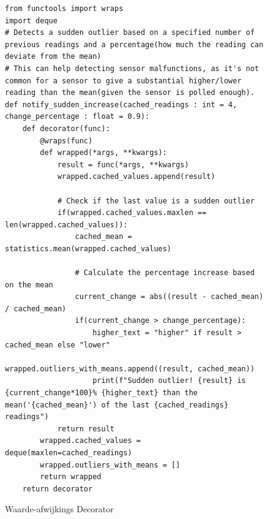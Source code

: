 \documentclass[a4paper]{report}
\begin{document}
\begin{figure}[H]
\begin{verbatim}
from functools import wraps
import deque
# Detects a sudden outlier based on a specified number of previous readings and a percentage(how much the reading can deviate from the mean)
# This can help detecting sensor malfunctions, as it's not common for a sensor to give a substantial higher/lower reading than the mean(given the sensor is polled enough).
def notify_sudden_increase(cached_readings : int = 4, change_percentage : float = 0.9):
    def decorator(func):
        @wraps(func)
        def wrapped(*args, **kwargs):
            result = func(*args, **kwargs)
            wrapped.cached_values.append(result)

            # Check if the last value is a sudden outlier
            if(wrapped.cached_values.maxlen == len(wrapped.cached_values)):
                cached_mean = statistics.mean(wrapped.cached_values)

                # Calculate the percentage increase based on the mean
                current_change = abs((result - cached_mean) / cached_mean)
                if(current_change > change_percentage):
                    higher_text = "higher" if result > cached_mean else "lower"
                    wrapped.outliers_with_means.append((result, cached_mean))
                    print(f"Sudden outlier! {result} is {current_change*100}% {higher_text} than the mean('{cached_mean}') of the last {cached_readings} readings")
            return result
        wrapped.cached_values = deque(maxlen=cached_readings)
        wrapped.outliers_with_means = []
        return wrapped 
    return decorator
\end{verbatim}
\caption{Waarde-afwijkings Decorator}
\label{fig:decorator_sudden_increase}
\end{figure}
\end{document}
